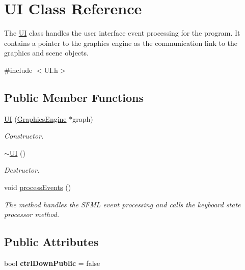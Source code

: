 \hypertarget{class_u_i}{}\section{UI Class Reference}
\label{class_u_i}


The \hyperlink{class_u_i}{UI} class handles the user interface event processing for the program. It contains a pointer to the graphics engine as the communication link to the graphics and scene objects.  




{\ttfamily \#include $<$U\+I.\+h$>$}

\subsection*{Public Member Functions}
\begin{DoxyCompactItemize}
\item 
\hyperlink{class_u_i_a9c605272304cb2d5efff79edb32e9241}{UI} (\hyperlink{class_graphics_engine}{Graphics\+Engine} $\ast$graph)
\begin{DoxyCompactList}\small\item\em Constructor. \end{DoxyCompactList}\item 
\hyperlink{class_u_i_a1b23d0c64c7cbb3d143d90ec532a7ccd}{$\sim$\+UI} ()
\begin{DoxyCompactList}\small\item\em Destructor. \end{DoxyCompactList}\item 
void \hyperlink{class_u_i_a440e133dbf19d82b8b40809644494068}{process\+Events} ()
\begin{DoxyCompactList}\small\item\em The method handles the S\+F\+ML event processing and calls the keyboard state processor method. \end{DoxyCompactList}\end{DoxyCompactItemize}
\subsection*{Public Attributes}
\begin{DoxyCompactItemize}
\item 
\mbox{\label{class_u_i_ade950517ac05d8b92b365d6ee42e1e3e}} 
bool {\bfseries ctrl\+Down\+Public} = false
\end{DoxyCompactItemize}


